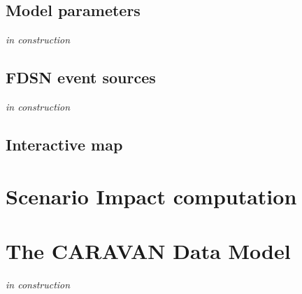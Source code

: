 \documentclass[12p]{article}
\begin{document}
\subsection{Model parameters}
\emph{in construction}

\subsection{FDSN event sources}
\emph{in construction}

\subsection{Interactive map}


\section{Scenario Impact computation}


\section{The CARAVAN Data Model}
\emph{in construction}
\end{document}
